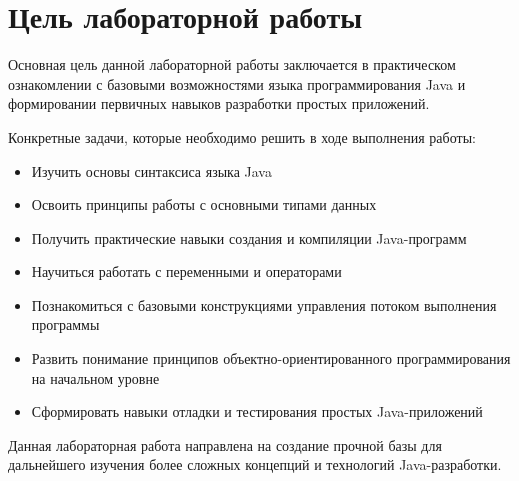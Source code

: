 \chapter*{Цель лабораторной работы}
\label{ch:Goal}

Основная цель данной лабораторной работы заключается в практическом ознакомлении с базовыми возможностями языка программирования Java и формировании первичных навыков разработки простых приложений.

Конкретные задачи, которые необходимо решить в ходе выполнения работы:

\begin{itemize}
  \item{Изучить основы синтаксиса языка Java}
  \item{Освоить принципы работы с основными типами данных}
  \item{Получить практические навыки создания и компиляции Java-программ}
  \item{Научиться работать с переменными и операторами}
  \item{Познакомиться с базовыми конструкциями управления потоком выполнения программы}
  \item{Развить понимание принципов объектно-ориентированного программирования на начальном уровне}
  \item{Сформировать навыки отладки и тестирования простых Java-приложений}
\end{itemize}

Данная лабораторная работа направлена на создание прочной базы для дальнейшего изучения более сложных концепций и технологий Java-разработки.

\endinput

